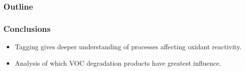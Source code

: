 \begin{frame}
    \frametitle{Outline} 
    \begin{flushleft}
        \tableofcontents[currentsection]
    \end{flushleft}
\end{frame} 

\begin{frame}
    \frametitle{Conclusions}

    \begin{itemize}
        \item Tagging gives deeper understanding of processes affecting oxidant reactivity. \vspace{5mm}
        \item Analysis of which VOC degradation products have greatest influence.
    \end{itemize}
\end{frame}
